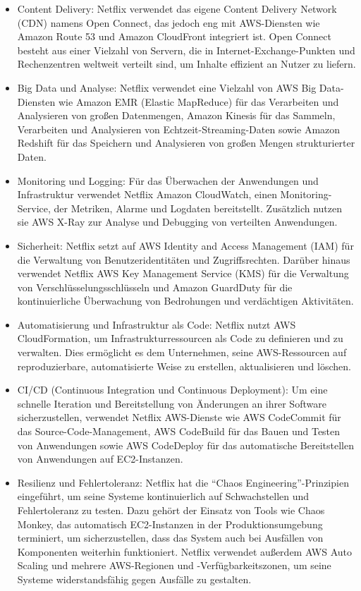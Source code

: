 \documentclass[../vs-script-first-v01.tex]{subfiles}
\begin{document}
\begin{itemize}
\item Content Delivery: Netflix verwendet das eigene Content Delivery Network (CDN) namens Open Connect, das jedoch eng mit AWS-Diensten wie Amazon Route 53 und Amazon CloudFront integriert ist. Open Connect besteht aus einer Vielzahl von Servern, die in Internet-Exchange-Punkten und Rechenzentren weltweit verteilt sind, um Inhalte effizient an Nutzer zu liefern.
\item Big Data und Analyse: Netflix verwendet eine Vielzahl von AWS Big Data-Diensten wie Amazon EMR (Elastic MapReduce) für das Verarbeiten und Analysieren von großen Datenmengen, Amazon Kinesis für das Sammeln, Verarbeiten und Analysieren von Echtzeit-Streaming-Daten sowie Amazon Redshift für das Speichern und Analysieren von großen Mengen strukturierter Daten.
\item Monitoring und Logging: Für das Überwachen der Anwendungen und Infrastruktur verwendet Netflix Amazon CloudWatch, einen Monitoring-Service, der Metriken, Alarme und Logdaten bereitstellt. Zusätzlich nutzen sie AWS X-Ray zur Analyse und Debugging von verteilten Anwendungen.
\item Sicherheit: Netflix setzt auf AWS Identity and Access Management (IAM) für die Verwaltung von Benutzeridentitäten und Zugriffsrechten. Darüber hinaus verwendet Netflix AWS Key Management Service (KMS) für die Verwaltung von Verschlüsselungsschlüsseln und Amazon GuardDuty für die kontinuierliche Überwachung von Bedrohungen und verdächtigen Aktivitäten.
\item Automatisierung und Infrastruktur als Code: Netflix nutzt AWS CloudFormation, um Infrastrukturressourcen als Code zu definieren und zu verwalten. Dies ermöglicht es dem Unternehmen, seine AWS-Ressourcen auf reproduzierbare, automatisierte Weise zu erstellen, aktualisieren und löschen.
\item CI/CD (Continuous Integration und Continuous Deployment): Um eine schnelle Iteration und Bereitstellung von Änderungen an ihrer Software sicherzustellen, verwendet Netflix AWS-Dienste wie AWS CodeCommit für das Source-Code-Management, AWS CodeBuild für das Bauen und Testen von Anwendungen sowie AWS CodeDeploy für das automatische Bereitstellen von Anwendungen auf EC2-Instanzen.
\item Resilienz und Fehlertoleranz: Netflix hat die \enquote{Chaos Engineering}-Prinzipien eingeführt, um seine Systeme kontinuierlich auf Schwachstellen und Fehlertoleranz zu testen. Dazu gehört der Einsatz von Tools wie Chaos Monkey, das automatisch EC2-Instanzen in der Produktionsumgebung terminiert, um sicherzustellen, dass das System auch bei Ausfällen von Komponenten weiterhin funktioniert. Netflix verwendet außerdem AWS Auto Scaling und mehrere AWS-Regionen und -Verfügbarkeitszonen, um seine Systeme widerstandsfähig gegen Ausfälle zu gestalten.
\end{itemize}
\end{document}
